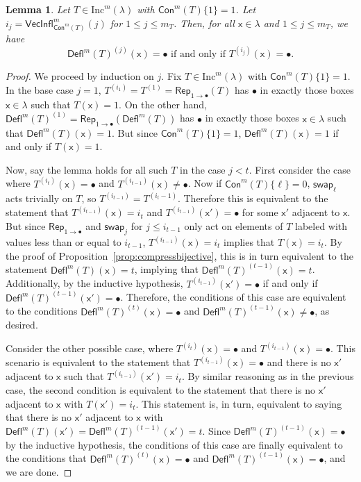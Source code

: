\documentclass[12pt]{amsart}
\newcommand{\x}{\ensuremath{\mathsf{x}}}
\newtheorem{lemma}[theorem]{Lemma}
\theoremstyle{definition}
\theoremstyle{remark}
\numberwithin{equation}{section}
\newcommand{\inc}{\ensuremath{\mathrm{Inc}}}
\newcommand{\swap}{\ensuremath{\mathsf{swap}}}
\newcommand{\rep}{\ensuremath{\mathsf{Rep}}}
\newcommand{\deflate}{\ensuremath{\mathsf{Defl}}}
\newcommand{\inflate}{\ensuremath{\mathsf{VecInfl}}}
\newcommand{\content}{\ensuremath{\mathsf{Con}}}
\begin{document}
\begin{lemma} \label{lem:bullet_placement}
Let $T \in \inc^m(\lambda)$ with $\content^m(T) \lbrace 1 \rbrace = 1$. Let $i_j = \inflate^m_{\content^m(T)}(j)$ for $1 \leq j \leq m_T$. Then, for all $\x \in \lambda$ and $1 \leq j \leq m_T$, we have
 \begin{equation}\label{eq:gappy_promotion2}
\deflate^m(T)^{(j)}(\x) = \bullet \text{ if and only if } T^{(i_j)}(\x) = \bullet.
\end{equation}
\end{lemma}
\begin{proof} We proceed by induction on $j$. Fix $T \in \inc^m(\lambda)$  with $\content^m(T) \lbrace 1 \rbrace = 1$. In the base case $j = 1$,  $T^{(i_1)} = T^{(1)} = \rep_{1 \rightarrow \bullet}(T)$ has $\bullet$ in exactly those boxes $\x \in \lambda$ such that $T(\x) = 1$. On the other hand, $\deflate^m(T)^{(1)} =  \rep_{1 \rightarrow \bullet}(\deflate^m(T))$ has $\bullet$ in exactly those boxes $\x \in \lambda$ such that $\deflate^m(T)(\x) = 1$. But since $\content^m(T) \lbrace 1 \rbrace = 1$, $\deflate^m(T)(\x) = 1$ if and only if $T(\x) = 1$. 


Now, say the lemma holds for all such $T$ in the case $j < t$. First consider the case where $T^{(i_t)}(\x) = \bullet$ and $T^{(i_{t-1})}(\x) \neq \bullet$. Now if $\content^m(T)\{ \ell \} = 0$, $\swap_\ell$ acts trivially on $T$, so $T^{(i_{t-1})} = T^{(i_t-1)}$. Therefore this is equivalent to the statement that $T^{(i_{t-1})}(\x) = i_t$ and $T^{(i_{t-1})}(\x') = \bullet$ for some $\x'$ adjacent to $\x$. But since $\rep_{1 \rightarrow \bullet}$ and $\swap_j$ for  $j \leq i_{t-1}$ only act on elements of $T$ labeled with values less than or equal to $i_{t-1}$, $T^{(i_{t-1})}(\x) = i_t$ implies that $T(\x) = i_t$. By the proof of Proposition~\ref{prop:compressbijective}, this is in turn equivalent to the statement $\deflate^m(T)(\x) = t$, implying that $\deflate^m(T)^{(t-1)}(\x) = t$. Additionally, by the inductive hypothesis, $T^{(i_{t-1})}(\x') = \bullet$ if and only if $\deflate^m(T)^{(t-1)}(\x') = \bullet$. Therefore, the conditions of this case are equivalent to the conditions $\deflate^m(T)^{(t)}(\x) = \bullet$ and $\deflate^m(T)^{(t-1)}(\x) \neq \bullet$, as desired. 

Consider the other possible case, where $T^{(i_t)}(\x) = \bullet$ and $T^{(i_{t-1})}(\x) = \bullet$. This scenario is equivalent to the statement that $T^{(i_{t-1})}(\x) = \bullet$ and there is no $\x'$ adjacent to $\x$ such that $T^{(i_{t-1})}(\x') = i_t$. By similar reasoning as in the previous case, the second condition is equivalent to the statement that there is no $\x'$ adjacent to $\x$ with $T(\x') = i_t$. This statement is, in turn, equivalent to saying that there is no $\x'$ adjacent to $\x$ with $\deflate^m(T)(\x') = \deflate^m(T)^{(t-1)}(\x') = t$. Since $\deflate^m(T)^{(t-1)}(\x) = \bullet$ by the inductive hypothesis, the conditions of this case are finally equivalent to the conditions that $\deflate^m(T)^{(t)}(\x) = \bullet$ and $\deflate^m(T)^{(t-1)}(\x) = \bullet$, and we are done.
\end{proof}
\end{document}
